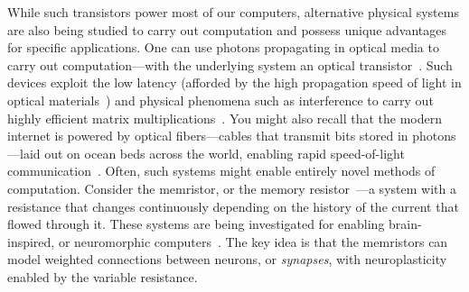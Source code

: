 \documentclass[main.tex]{subfiles}
\begin{document}
While such transistors power most of our computers, alternative physical systems are also being studied to carry out computation and possess unique advantages for specific applications. One can use photons propagating in optical media to carry out computation---with the underlying system an optical transistor~\cite{kazanskiy2022optical, chen2013all}. Such devices exploit the low latency (afforded by the high propagation speed of light in optical materials~\cite{badloe2022}) and physical phenomena such as interference to carry out highly efficient matrix multiplications~\cite{zhou2022phot}. You might also recall that the modern internet is powered by optical fibers---cables that transmit bits stored in photons---laid out on ocean beds across the world, enabling rapid speed-of-light communication~\cite{amiri2019technical}. Often, such systems might enable entirely novel methods of computation. Consider the memristor, or the memory resistor~\cite{strukov2008missing}---a system with a resistance that changes continuously depending on the history of the current that flowed through it. These systems are being investigated for enabling brain-inspired, or neuromorphic computers~\cite{li2018review}. The key idea is that the memristors can model weighted connections between neurons, or \emph{synapses}, with neuroplasticity enabled by the variable resistance. 
\end{document}

